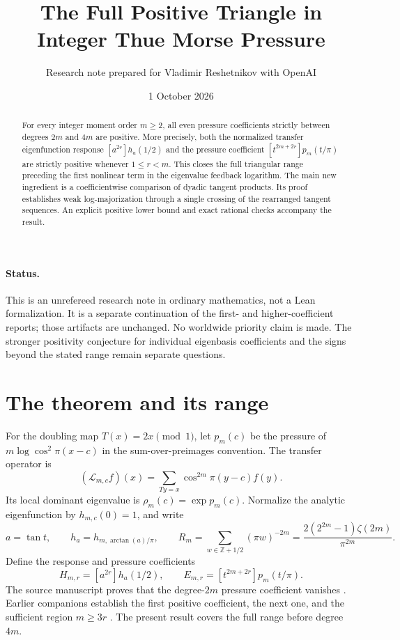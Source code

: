 \documentclass[11pt,a4paper]{article}
\title{The Full Positive Triangle in Integer Thue Morse Pressure}
\author{Research note prepared for Vladimir Reshetnikov with OpenAI}
\date{1 October 2026}
\theoremstyle{remark}\newtheorem*{ednote}{Editorial note (ProveIt, 2026-10-01)}
\newcommand{\Z}{\mathbb Z}\newcommand{\E}{\mathcal E}\newcommand{\ii}{\mathrm i}
\newcommand{\Lop}{\mathcal L}
\begin{document}
\maketitle
\begin{abstract}
For every integer moment order $m\ge2$, all even pressure coefficients strictly between degrees $2m$ and $4m$ are positive. More precisely, both the normalized transfer eigenfunction response $[a^{2r}]h_a(1/2)$ and the pressure coefficient $[t^{2m+2r}]p_m(t/\pi)$ are strictly positive whenever $1\le r<m$. This closes the full triangular range preceding the first nonlinear term in the eigenvalue feedback logarithm. The main new ingredient is a coefficientwise comparison of dyadic tangent products. Its proof establishes weak log-majorization through a single crossing of the rearranged tangent sequences. An explicit positive lower bound and exact rational checks accompany the result.
\end{abstract}

\paragraph{Status.}
This is an unrefereed research note in ordinary mathematics, not a Lean formalization. It is a separate continuation of the first- and higher-coefficient reports; those artifacts are unchanged. No worldwide priority claim is made. The stronger positivity conjecture for individual eigenbasis coefficients and the signs beyond the stated range remain separate questions.

\section{The theorem and its range}
For the doubling map $T(x)=2x\pmod1$, let $p_m(c)$ be the pressure of $m\log\cos^2\!\pi(x-c)$ in the sum-over-preimages convention. The transfer operator is
\[
 (\Lop_{m,c}f)(x)=\sum_{Ty=x}\cos^{2m}\!\pi(y-c)f(y).
\]
Its local dominant eigenvalue is $\rho_m(c)=\exp p_m(c)$. Normalize the analytic eigenfunction by $h_{m,c}(0)=1$, and write
\[
 a=\tan t,\qquad h_a=h_{m,\arctan(a)/\pi},\qquad
 R_m=\sum_{w\in\Z+1/2}(\pi w)^{-2m}
 =\frac{2(2^{2m}-1)\zeta(2m)}{\pi^{2m}}.
\]
Define the response and pressure coefficients
\[
 H_{m,r}=[a^{2r}]h_a(1/2),\qquad
 E_{m,r}=[t^{2m+2r}]p_m(t/\pi).
\]
The source manuscript proves that the degree-$2m$ pressure coefficient vanishes \cite{integer}. Earlier companions establish the first positive coefficient, the next one, and the sufficient region $m\ge3r$ \cite{first,higher}. The present result covers the full range before degree $4m$.
\end{document}
